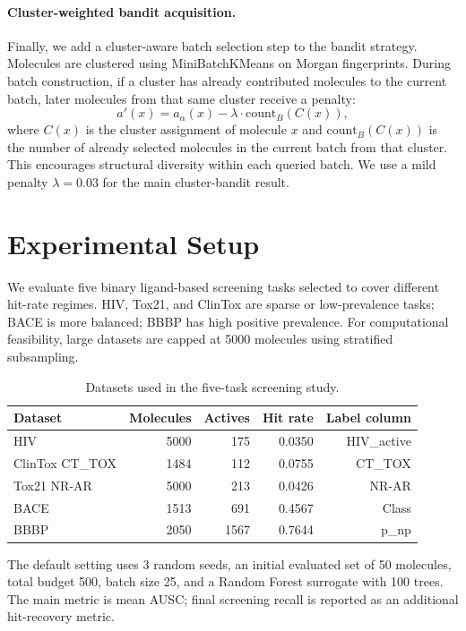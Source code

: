 \documentclass[10pt]{article}
\begin{document}
\paragraph{Cluster-weighted bandit acquisition.}
Finally, we add a cluster-aware batch selection step to the bandit strategy. Molecules are clustered using MiniBatchKMeans on Morgan fingerprints. During batch construction, if a cluster has already contributed molecules to the current batch, later molecules from that same cluster receive a penalty:
\[
a'(x)=a_{\alpha}(x)-\lambda \cdot \mathrm{count}_{B}(C(x)),
\]
where $C(x)$ is the cluster assignment of molecule $x$ and $\mathrm{count}_{B}(C(x))$ is the number of already selected molecules in the current batch from that cluster. This encourages structural diversity within each queried batch. We use a mild penalty $\lambda=0.03$ for the main cluster-bandit result.

\section{Experimental Setup}

We evaluate five binary ligand-based screening tasks selected to cover different hit-rate regimes. HIV, Tox21, and ClinTox are sparse or low-prevalence tasks; BACE is more balanced; BBBP has high positive prevalence. For computational feasibility, large datasets are capped at 5000 molecules using stratified subsampling.

\begin{table}[H]
\centering
\caption{Datasets used in the five-task screening study.}
\label{tab:datasets}
\begin{tabular}{lrrrr}
\toprule
Dataset & Molecules & Actives & Hit rate & Label column \\
\midrule
HIV & 5000 & 175 & 0.0350 & HIV\_active \\
ClinTox CT\_TOX & 1484 & 112 & 0.0755 & CT\_TOX \\
Tox21 NR-AR & 5000 & 213 & 0.0426 & NR-AR \\
BACE & 1513 & 691 & 0.4567 & Class \\
BBBP & 2050 & 1567 & 0.7644 & p\_np \\
\bottomrule
\end{tabular}
\end{table}

The default setting uses 3 random seeds, an initial evaluated set of 50 molecules, total budget 500, batch size 25, and a Random Forest surrogate with 100 trees. The main metric is mean AUSC; final screening recall is reported as an additional hit-recovery metric.
\end{document}
